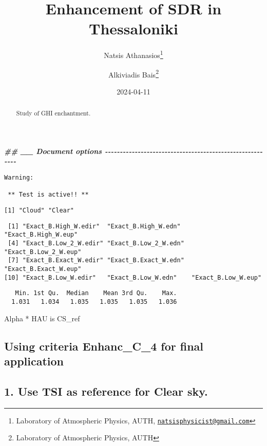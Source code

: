 \documentclass[
  10pt,
  a4paper,oneside]{article}
\title{Enhancement of SDR in Thessaloniki}
\author{Natsis Athanasios\footnote{Laboratory of Atmospheric Physics, AUTH, \href{mailto:natsisphysicist@gmail.com}{\nolinkurl{natsisphysicist@gmail.com}}} \and Alkiviadis Bais\footnote{Laboratory of Atmospheric Physics, AUTH}}
\date{2024-04-11}
\newenvironment{Shaded}{\begin{snugshade}}{\end{snugshade}}
\newcommand{\DocumentationTok}[1]{\textcolor[rgb]{0.56,0.35,0.01}{\textbf{\textit{#1}}}}
\begin{document}
\maketitle
\begin{abstract}
Study of GHI enchantment.
\end{abstract}

{
\hypersetup{linkcolor=}
\setcounter{tocdepth}{4}
\tableofcontents
}
\begin{Shaded}
\begin{Highlighting}[]
\DocumentationTok{\#\# \_\_ Document options {-}{-}{-}{-}{-}{-}{-}{-}{-}{-}{-}{-}{-}{-}{-}{-}{-}{-}{-}{-}{-}{-}{-}{-}{-}{-}{-}{-}{-}{-}{-}{-}{-}{-}{-}{-}{-}{-}{-}{-}{-}{-}{-}{-}{-}{-}{-}{-}{-}{-}{-}{-}{-}{-}{-}{-}{-}}
\end{Highlighting}
\end{Shaded}

\begin{verbatim}
Warning: 

 ** Test is active!! ** 
\end{verbatim}

\begin{verbatim}
[1] "Cloud" "Clear"
\end{verbatim}

\begin{verbatim}
 [1] "Exact_B.High_W.edir"  "Exact_B.High_W.edn"   "Exact_B.High_W.eup"  
 [4] "Exact_B.Low_2_W.edir" "Exact_B.Low_2_W.edn"  "Exact_B.Low_2_W.eup" 
 [7] "Exact_B.Exact_W.edir" "Exact_B.Exact_W.edn"  "Exact_B.Exact_W.eup" 
[10] "Exact_B.Low_W.edir"   "Exact_B.Low_W.edn"    "Exact_B.Low_W.eup"   
\end{verbatim}

\begin{verbatim}
   Min. 1st Qu.  Median    Mean 3rd Qu.    Max. 
  1.031   1.034   1.035   1.035   1.035   1.036 
\end{verbatim}

Alpha * HAU is CS\_ref

\hypertarget{using-criteria-enhanc_c_4-for-final-application}{%
\subsection{\texorpdfstring{Using criteria \textbf{Enhanc\_C\_4} for final application}{Using criteria Enhanc\_C\_4 for final application}}\label{using-criteria-enhanc_c_4-for-final-application}}

\hypertarget{use-tsi-as-reference-for-clear-sky.}{%
\subsection{1. Use TSI as reference for Clear sky.}\label{use-tsi-as-reference-for-clear-sky.}}
\end{document}
